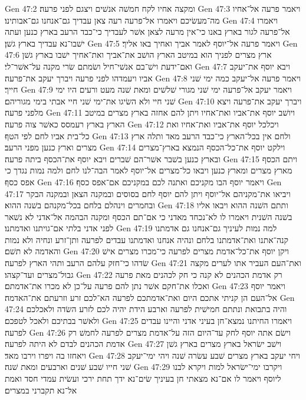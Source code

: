 Gen 47:2  ומקצה אחיו לקח חמשׁה אנשׁים ויצגם לפני פרעה׃
Gen 47:3  ויאמר פרעה אל־אחיו מה־מעשׂיכם ויאמרו אל־פרעה רעה צאן עבדיך גם־אנחנו גם־אבותינו׃
Gen 47:4  ויאמרו אל־פרעה לגור בארץ באנו כי־אין מרעה לצאן אשׁר לעבדיך כי־כבד הרעב בארץ כנען ועתה ישׁבו־נא עבדיך בארץ גשׁן׃
Gen 47:5  ויאמר פרעה אל־יוסף לאמר אביך ואחיך באו אליך׃
Gen 47:6  ארץ מצרים לפניך הוא במיטב הארץ הושׁב את־אביך ואת־אחיך ישׁבו בארץ גשׁן ואם־ידעת וישׁ־בם אנשׁי־חיל ושׂמתם שׂרי מקנה על־אשׁר־לי׃
Gen 47:7  ויבא יוסף את־יעקב אביו ויעמדהו לפני פרעה ויברך יעקב את־פרעה׃
Gen 47:8  ויאמר פרעה אל־יעקב כמה ימי שׁני חייך׃
Gen 47:9  ויאמר יעקב אל־פרעה ימי שׁני מגורי שׁלשׁים ומאת שׁנה מעט ורעים היו ימי שׁני חיי ולא השׂיגו את־ימי שׁני חיי אבתי בימי מגוריהם׃
Gen 47:10  ויברך יעקב את־פרעה ויצא מלפני פרעה׃
Gen 47:11  ויושׁב יוסף את־אביו ואת־אחיו ויתן להם אחזה בארץ מצרים במיטב הארץ בארץ רעמסס כאשׁר צוה פרעה׃
Gen 47:12  ויכלכל יוסף את־אביו ואת־אחיו ואת כל־בית אביו לחם לפי הטף׃
Gen 47:13  ולחם אין בכל־הארץ כי־כבד הרעב מאד ותלה ארץ מצרים וארץ כנען מפני הרעב׃
Gen 47:14  וילקט יוסף את־כל־הכסף הנמצא בארץ־מצרים ובארץ כנען בשׁבר אשׁר־הם שׁברים ויבא יוסף את־הכסף ביתה פרעה׃
Gen 47:15  ויתם הכסף מארץ מצרים ומארץ כנען ויבאו כל־מצרים אל־יוסף לאמר הבה־לנו לחם ולמה נמות נגדך כי אפס כסף׃
Gen 47:16  ויאמר יוסף הבו מקניכם ואתנה לכם במקניכם אם־אפס כסף׃
Gen 47:17  ויביאו את־מקניהם אל־יוסף ויתן להם יוסף לחם בסוסים ובמקנה הצאן ובמקנה הבקר ובחמרים וינהלם בלחם בכל־מקנהם בשׁנה ההוא׃
Gen 47:18  ותתם השׁנה ההוא ויבאו אליו בשׁנה השׁנית ויאמרו לו לא־נכחד מאדני כי אם־תם הכסף ומקנה הבהמה אל־אדני לא נשׁאר לפני אדני בלתי אם־גויתנו ואדמתנו׃
Gen 47:19  למה נמות לעיניך גם־אנחנו גם אדמתנו קנה־אתנו ואת־אדמתנו בלחם ונהיה אנחנו ואדמתנו עבדים לפרעה ותן־זרע ונחיה ולא נמות והאדמה לא תשׁם׃
Gen 47:20  ויקן יוסף את־כל־אדמת מצרים לפרעה כי־מכרו מצרים אישׁ שׂדהו כי־חזק עלהם הרעב ותהי הארץ לפרעה׃
Gen 47:21  ואת־העם העביר אתו לערים מקצה גבול־מצרים ועד־קצהו׃
Gen 47:22  רק אדמת הכהנים לא קנה כי חק לכהנים מאת פרעה ואכלו את־חקם אשׁר נתן להם פרעה על־כן לא מכרו את־אדמתם׃
Gen 47:23  ויאמר יוסף אל־העם הן קניתי אתכם היום ואת־אדמתכם לפרעה הא־לכם זרע וזרעתם את־האדמה׃
Gen 47:24  והיה בתבואת ונתתם חמישׁית לפרעה וארבע הידת יהיה לכם לזרע השׂדה ולאכלכם ולאשׁר בבתיכם ולאכל לטפכם׃
Gen 47:25  ויאמרו החיתנו נמצא־חן בעיני אדני והיינו עבדים לפרעה׃
Gen 47:26  וישׂם אתה יוסף לחק עד־היום הזה על־אדמת מצרים לפרעה לחמשׁ רק אדמת הכהנים לבדם לא היתה לפרעה׃
Gen 47:27  וישׁב ישׂראל בארץ מצרים בארץ גשׁן ויאחזו בה ויפרו וירבו מאד׃
Gen 47:28  ויחי יעקב בארץ מצרים שׁבע עשׂרה שׁנה ויהי ימי־יעקב שׁני חייו שׁבע שׁנים וארבעים ומאת שׁנה׃
Gen 47:29  ויקרבו ימי־ישׂראל למות ויקרא לבנו ליוסף ויאמר לו אם־נא מצאתי חן בעיניך שׂים־נא ידך תחת ירכי ועשׂית עמדי חסד ואמת אל־נא תקברני במצרים׃
